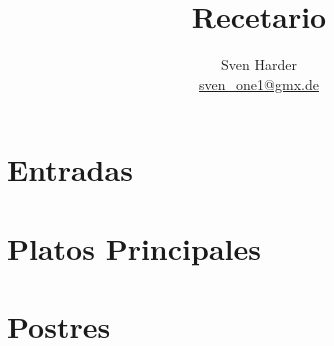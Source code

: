 \documentclass[%
a4paper,
11pt
]{article}
\begin{document}
\title{Recetario}
\author{Sven Harder\\ \href{mailto:sven\_one1@gmx.de}{sven\_one1@gmx.de}}


\tableofcontents

\vspace{5em}

\section{Entradas}



\section{Platos Principales}


%






\section{Postres}



\end{document}
